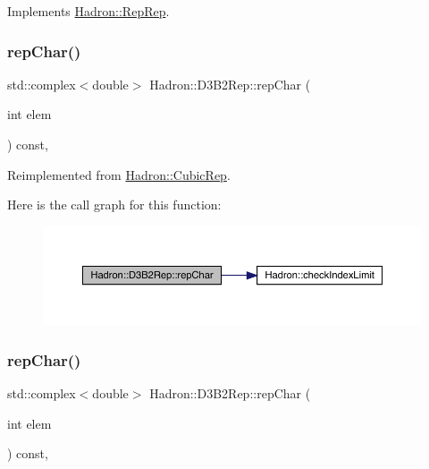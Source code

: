 Implements \mbox{\hyperlink{structHadron_1_1RepRep_ab3213025f6de249f7095892109575fde}{Hadron\+::\+Rep\+Rep}}.

\mbox{\label{structHadron_1_1D3B2Rep_a905f3eda8837cdc95ef5c897f8ea4bd7}} 
\subsubsection{\texorpdfstring{repChar()}{repChar()}\hspace{0.1cm}{\footnotesize\ttfamily [1/3]}}
{\footnotesize\ttfamily std\+::complex$<$double$>$ Hadron\+::\+D3\+B2\+Rep\+::rep\+Char (\begin{DoxyParamCaption}\item[{int}]{elem }\end{DoxyParamCaption}) const\hspace{0.3cm}{\ttfamily [inline]}, {\ttfamily [virtual]}}



Reimplemented from \mbox{\hyperlink{structHadron_1_1CubicRep_af45227106e8e715e84b0af69cd3b36f8}{Hadron\+::\+Cubic\+Rep}}.

Here is the call graph for this function\+:
\nopagebreak
\begin{figure}[H]
\begin{center}
\leavevmode
\includegraphics[width=350pt]{d3/d61/structHadron_1_1D3B2Rep_a905f3eda8837cdc95ef5c897f8ea4bd7_cgraph}
\end{center}
\end{figure}
\mbox{\label{structHadron_1_1D3B2Rep_a905f3eda8837cdc95ef5c897f8ea4bd7}} 
\subsubsection{\texorpdfstring{repChar()}{repChar()}\hspace{0.1cm}{\footnotesize\ttfamily [2/3]}}
{\footnotesize\ttfamily std\+::complex$<$double$>$ Hadron\+::\+D3\+B2\+Rep\+::rep\+Char (\begin{DoxyParamCaption}\item[{int}]{elem }\end{DoxyParamCaption}) const\hspace{0.3cm}{\ttfamily [inline]}, {\ttfamily [virtual]}}



